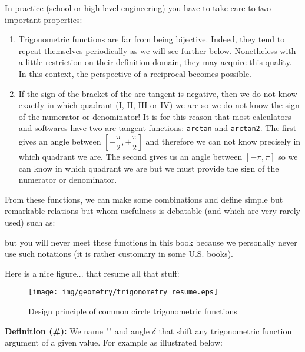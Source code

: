 In practice (school or high level engineering) you have to take care to two important properties: 
	\begin{enumerate}
		\item Trigonometric functions are far from being bijective. Indeed, they tend to repeat themselves periodically as we will see further below. Nonetheless with a little restriction on their definition domain, they may acquire this quality. In this context, the perspective of a reciprocal becomes possible.
		\item If the sign of the bracket of the arc tangent is negative, then we do not know exactly in which quadrant (I, II, III or IV) we are so we do not know the sign of the numerator or denominator! It is for this reason that most calculators and softwares have two arc tangent functions: \texttt{arctan} and \texttt{arctan2}. The first gives an angle between $\left[-\dfrac{\pi}{2},+\dfrac{\pi}{2}\right]$ and therefore we can not know precisely in which quadrant we are. The second gives us an angle between $\left[-\pi,\pi\right]$ so we can know in which quadrant we are but we must provide the sign of the numerator or denominator.
	\end{enumerate}

	From these functions, we can make some combinations and define simple but remarkable relations but whom usefulness is debatable (and which are very rarely used) such as:
	
	but you will never meet these functions in this book because we personally never use such notations (it is rather customary in some U.S. books).
	
	Here is a nice figure... that resume all that stuff:
	
	\begin{figure}[H]
	\centering
	\texttt{[image: img/geometry/trigonometry\_resume.eps]}
	\caption{Design principle of common circle trigonometric functions}
	\end{figure}
	
	\textbf{Definition (\#\mydef):} We name "" and angle $\delta$ that shift any trigonometric function argument of a given value. For example as illustrated below:
	
	\begin{figure}[H]
	\centering
	\end{figure}
	
